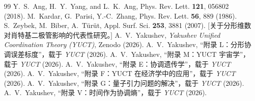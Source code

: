 \documentclass[12pt,a4paper]{article}
\begin{document}
	\begin{thebibliography}{99}
		 Y.~S.~Ang, H.~Y.~Yang, and L.~K.~Ang,
		Phys. Rev. Lett. \textbf{121}, 056802 (2018).
		 M.~Kardar, G.~Parisi, Y.-C.~Zhang,
		Phys. Rev. Lett. \textbf{56}, 889 (1986).
		 S.~Zeybek, M.~Biber, A.~Türüt,
		Appl. Surf. Sci. \textbf{253}, 3881 (2007). [关于分形维数对肖特基二极管影响的代表性研究。]
		 A.~V.~Yakushev, \emph{Yakushev Unified Coordination Theory (YUCT)}, Zenodo (2026).
		 A.~V.~Yakushev, “附录 L：分形协调误差标度”，载于 \emph{YUCT} (2026).
		 A.~V.~Yakushev, “附录 M：YUCT 宇宙学”，载于 \emph{YUCT} (2026).
		 A.~V.~Yakushev, “附录 E：协调遗传学”，载于 \emph{YUCT} (2026).
		 A.~V.~Yakushev, “附录 F：YUCT 在经济学中的应用”，载于 \emph{YUCT} (2026).
		 A.~V.~Yakushev, “附录 G：量子引力问题的解决”，载于 \emph{YUCT} (2026).
		 A.~V.~Yakushev, “附录 V：时间作为协调熵”，载于 \emph{YUCT} (2026).
	\end{thebibliography}
	
\end{document}
